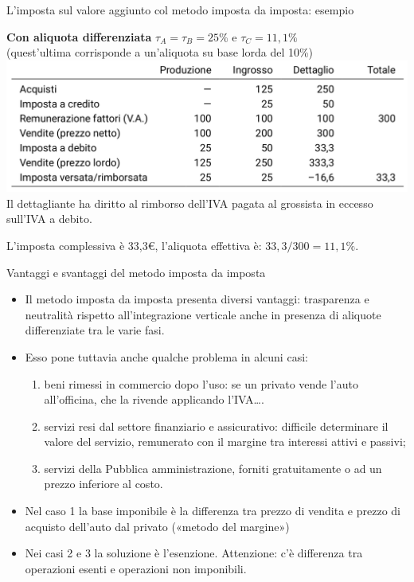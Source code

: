 \documentclass[aspectratio=64,11pt]{beamer}
\begin{document}
\begin{frame}{L'imposta sul valore aggiunto col metodo imposta da imposta: esempio}
\begin{block}{}
\textbf{Con aliquota differenziata} $\tau_A=\tau_B=25\%$ e $\tau_C=11,1\%$\\
(quest'ultima corrisponde a un'aliquota su base lorda del 10\%)\\
\includegraphics[width=\textwidth]{./figure/esempio-imposta-da-imposta-2.png}\\
Il dettagliante ha diritto al rimborso dell'IVA pagata al grossista in
eccesso sull'IVA a debito.

L'imposta complessiva è 33,3€, l'aliquota effettiva è: $33,3/300=11,1\%$.
\end{block}
\end{frame}

\begin{frame}{Vantaggi e svantaggi del metodo imposta da imposta}
\begin{itemize}
\item Il metodo imposta da imposta presenta diversi vantaggi: trasparenza e
neutralità rispetto all'integrazione verticale anche in presenza di aliquote
differenziate tra le varie fasi.
\item Esso pone tuttavia anche qualche problema in alcuni casi:
\begin{enumerate}
\item \alert{beni rimessi in commercio dopo l'uso}: se un privato vende l'auto
all'officina, che la rivende applicando l'IVA\ldots{}.
\item \alert{servizi resi dal settore finanziario e assicurativo}: difficile
determinare il valore del servizio, remunerato con il margine tra
interessi attivi e passivi;
\item \alert{servizi della Pubblica amministrazione}, forniti gratuitamente o ad un
prezzo inferiore al costo.
\end{enumerate}
\item Nel caso 1 la base imponibile è la differenza tra prezzo di vendita e prezzo
di acquisto dell'auto dal privato («metodo del margine»)
\item Nei casi 2 e 3 la soluzione è l'\alert{esenzione}. Attenzione: c'è differenza tra
operazioni esenti e operazioni non imponibili.
\end{itemize}
\end{frame}
\end{document}
